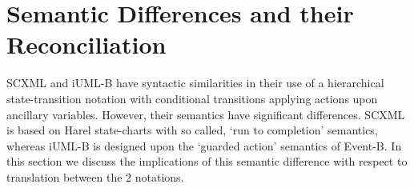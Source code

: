 
\section{Semantic Differences and their Reconciliation}
\label{sect:diff}


SCXML and iUML-B have syntactic similarities in their use of a hierarchical state-transition notation with conditional transitions applying actions upon ancillary variables.
However, their semantics have significant differences. SCXML is based on Harel state-charts with so called, `run to completion' semantics, whereas iUML-B is designed upon the `guarded action' semantics of Event-B.
In this section we discuss the implications of this semantic difference with respect to translation between the 2 notations.

